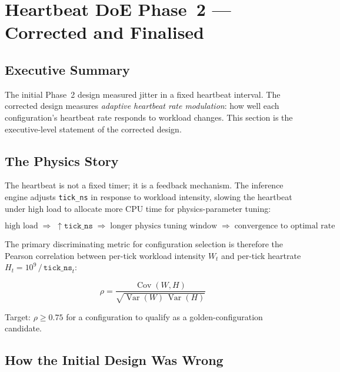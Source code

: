 
\section{Heartbeat DoE Phase~2 — Corrected and Finalised}
\label{sec:heartbeat-doe-phase2-corrected}

\subsection{Executive Summary}

The initial Phase~2 design measured jitter in a fixed heartbeat interval.
The corrected design measures \emph{adaptive heartbeat rate modulation}: how
well each configuration's heartbeat rate responds to workload changes. This
section is the executive-level statement of the corrected design.

\subsection{The Physics Story}

The heartbeat is not a fixed timer; it is a feedback mechanism. The inference
engine adjusts \texttt{tick\_ns} in response to workload intensity, slowing
the heartbeat under high load to allocate more CPU time for physics-parameter
tuning:

\[
  \text{high load} \;\Rightarrow\; \uparrow\texttt{tick\_ns}
  \;\Rightarrow\; \text{longer physics tuning window}
  \;\Rightarrow\; \text{convergence to optimal rate}
\]

The primary discriminating metric for configuration selection is therefore the
Pearson correlation between per-tick workload intensity $W_t$ and per-tick
heartrate $H_t = 10^9\,/\,\texttt{tick\_ns}_t$:

\begin{equation}
  \rho = \frac{\operatorname{Cov}(W, H)}
              {\sqrt{\operatorname{Var}(W)\,\operatorname{Var}(H)}}
\end{equation}

Target: $\rho \geq 0.75$ for a configuration to qualify as a golden-configuration
candidate.

\subsection{How the Initial Design Was Wrong}

